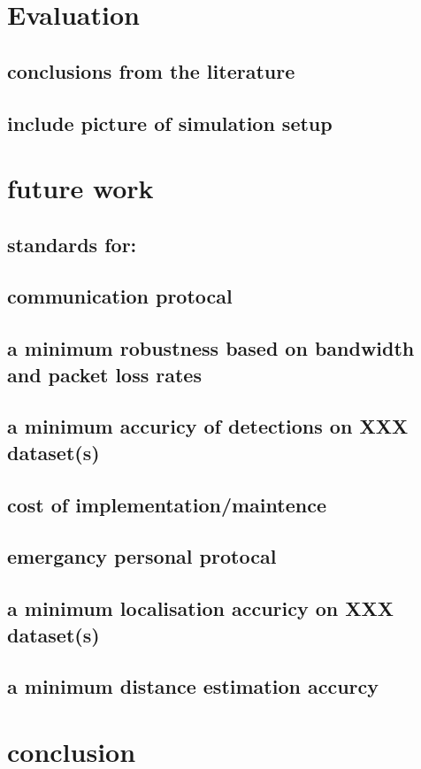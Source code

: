 \documentclass[conference]{IEEEtran}
\begin{document}
\section{Evaluation}
\subsection{conclusions from the literature}
\subsection{include picture of simulation setup}

\section{future work}
\subsection{standards for:}
\subsection{communication protocal}
\subsection{a minimum robustness based on bandwidth and packet loss rates}
\subsection{a minimum accuricy of detections on XXX dataset(s)}
\subsection{cost of implementation/maintence}
\subsection{emergancy personal protocal}
\subsection{a minimum localisation accuricy on XXX dataset(s)}
\subsection{a minimum distance estimation accurcy}

\section{conclusion}
\end{document}
